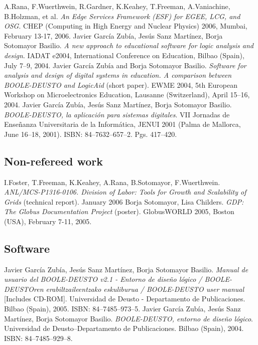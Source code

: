 \documentclass{resume}
\begin{document}
\begin{category}{}
\citembullet A.Rana, F.Wuerthwein, R.Gardner, K.Keahey, T.Freeman, A.Vaniachine, B.Holzman, et al. \emph{An Edge Services Framework (ESF) for EGEE, LCG, and OSG}. CHEP (Computing in High Energy and Nuclear Physics) 2006, Mumbai, February 13-17, 2006.
\citembullet Javier García Zubía, Jesús Sanz Martínez, Borja Sotomayor Basilio. \emph{A new approach to educational software for logic analysis and design}. IADAT e2004, International Conference on Education, Bilbao (Spain), July 7--9, 2004.
\citembullet Javier García Zubía and Borja Sotomayor Basilio. \emph{Software for analysis and design of digital systems in education. A comparison between BOOLE-DEUSTO and LogicAid} (short paper). EWME 2004,  5th European Workshop on Microelectronics Education, Lausanne (Switzerland), April 15--16, 2004.
\citembullet Javier García Zubía, Jesús Sanz Martínez, Borja Sotomayor Basilio. \emph{BOOLE-DEUSTO, la aplicación para
sistemas digitales}. VII Jornadas de Enseñanza Universitaria de la
Informática, JENUI 2001 (Palma de Mallorca, June 16--18, 2001).
ISBN: 84--7632--657--2. Pgs. 417--420.
\end{category}

\subsection*{Non-refereed work}
\begin{category}{}
\citembullet I.Foster, T.Freeman, K.Keahey, A.Rana, B.Sotomayor, F.Wuerthwein. \emph{ANL/MCS-P1316-0106. Division of Labor: Tools for Growth and Scalability of Grids} (technical report). January 2006
\citembullet Borja Sotomayor, Lisa Childers. \emph{GDP: The Globus Documentation Project} (poster). GlobusWORLD 2005, Boston (USA), February 7-11, 2005.
\end{category}


\subsection*{Software}
\begin{category}{}
\citembullet Javier García Zubía, Jesús Sanz Martínez, Borja Sotomayor Basilio. \emph{Manual de usuario del BOOLE-DEUSTO v2.1 - Entorno de diseño lógico / BOOLE-DEUSTOren erabiltzaileentzako eskuliburua / BOOLE-DEUSTO user manual} [Includes CD-ROM]. Universidad de Deusto - Departamento de Publicaciones. Bilbao (Spain), 2005. ISBN: 84--7485--973--5.
\citembullet Javier García Zubía, Jesús Sanz Martínez, Borja Sotomayor Basilio. \emph{BOOLE-DEUSTO, entorno de diseño lógico}. Universidad de Deusto--Departamento de Publicaciones. Bilbao (Spain), 2004. ISBN: 84--7485--929--8.
\end{category}
\end{document}
